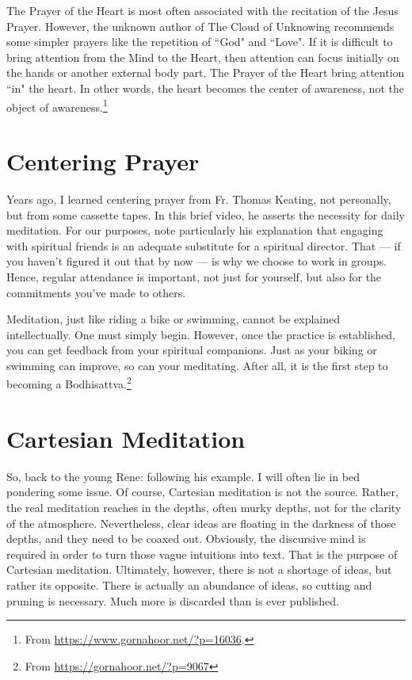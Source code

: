 The Prayer of the Heart is most often associated with the recitation of the Jesus Prayer. However, the unknown author of The Cloud of Unknowing recommends some simpler prayers like the repetition of ``God" and ``Love". If it is difficult to bring attention from the Mind to the Heart, then attention can focus initially on the hands or another external body part. The Prayer of the Heart bring attention ``in" the heart. In other words, the heart becomes the center of awareness, not the object of awareness.\footnote{From \url{https://www.gornahoor.net/?p=16036}.}

\section{Centering Prayer}

Years ago, I learned centering prayer from Fr. Thomas Keating, not personally, but from some cassette tapes. In this brief video, he asserts the necessity for daily meditation. For our purposes, note particularly his explanation that engaging with spiritual friends is an adequate substitute for a spiritual director. That — if you haven’t figured it out that by now — is why we choose to work in groups. Hence, regular attendance is important, not just for yourself, but also for the commitments you’ve made to others.

Meditation, just like riding a bike or swimming, cannot be explained intellectually. One must simply begin. However, once the practice is established, you can get feedback from your spiritual companions. Just as your biking or swimming can improve, so can your meditating. After all, it is the first step to becoming a Bodhisattva.\footnote{From \url{https://gornahoor.net/?p=9067}}

\section{Cartesian Meditation}

So, back to the young Rene: following his example. I will often lie in bed pondering some issue. Of course, Cartesian meditation is not the source. Rather, the real meditation reaches in the depths, often murky depths, not for the clarity of the atmosphere. Nevertheless, clear ideas are floating in the darkness of those depths, and they need to be coaxed out. Obviously, the discursive mind is required in order to turn those vague intuitions into text. That is the purpose of Cartesian meditation. Ultimately, however, there is not a shortage of ideas, but rather its opposite. There is actually an abundance of ideas, so cutting and pruning is necessary. Much more is discarded than is ever published.

